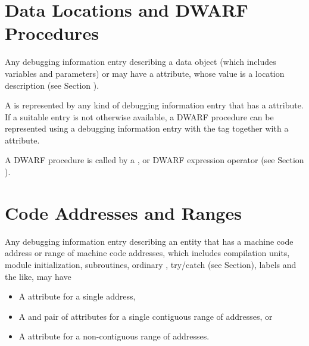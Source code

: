 \section{Data Locations and DWARF Procedures}
Any debugging information entry describing a data object (which
\hypertarget{chap:DWATlocationdataobjectlocation}{}
includes variables and parameters) or 
may have 
a
\DWATlocation{} attribute,
whose value is a location description
(see Section ).

A 
is represented by any
kind of debugging information entry that has 
a 
\DWATlocation{}
attribute. 
If a suitable entry is not otherwise available,
a DWARF procedure can be represented using a debugging
information entry with the 
tag \DWTAGdwarfprocedureTARG{}
together with 
a \DWATlocation{} attribute.  

A DWARF procedure
is called by a \DWOPcalltwo, 
\DWOPcallfour{} or 
\DWOPcallref{}
DWARF expression operator 
(see Section ).

\section{Code Addresses and Ranges}
\label{chap:codeaddressesandranges}
Any debugging information entry describing an entity that has
a machine code address or range of machine code addresses,
which includes compilation units, module initialization,
\hypertarget{chap:DWATrangesnoncontiguousrangeofcodeaddresses}{}
subroutines, ordinary , 
try/catch  (see Section), 
labels and the like, may have
\begin{itemize}
\item A \DWATlowpc{} attribute for
\hypertarget{chap:DWATlowpccodeaddressorrangeofaddresses}{}
a single address,

\item A \DWATlowpc{}
and 
\DWAThighpc{}
\hypertarget{chap:DWAThighpccontiguousrangeofcodeaddresses}{}
pair of attributes for 
a single contiguous range of
addresses, or

\item A \DWATranges{} attribute 
for a non-contiguous range of addresses.
\end{itemize}

